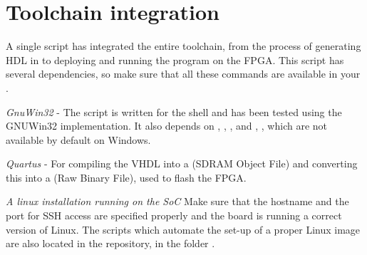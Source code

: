 \chapter{Toolchain integration}
\label{app:toolchain_integration}

A single script has integrated the entire toolchain, from the process of generating HDL in \clash{} to deploying and running the program on the FPGA. This script has several dependencies, so make sure that all these commands are available in your .

\begin{itemizens}
\item \emph{GnuWin32} - The script is written for the  shell and has been tested using the GNUWin32 implementation. It also depends on , , ,  and , , which are not available by default on Windows.
\item \emph{Quartus} - For compiling the VHDL into a  (SDRAM Object File) and converting this into a  (Raw Binary File), used to flash the FPGA.
\item \emph{A linux installation running on the SoC} Make sure that the hostname and the port for SSH access are specified properly and the board is running a correct version of Linux. The scripts which automate the set-up of a proper Linux image are also located in the repository, in the folder .
\end{itemizens}

